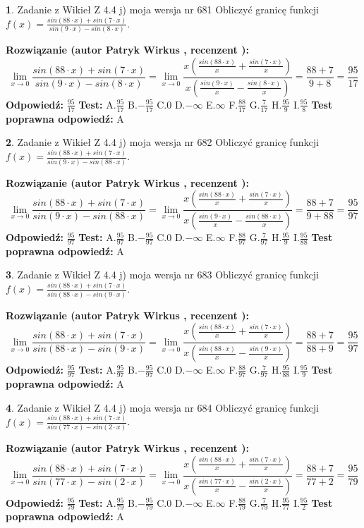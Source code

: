 \documentclass[12pt, a4paper]{article}
\theoremstyle{definition} %
\newtheorem{zad}{}
\newcommand{\zadStart}[1]{\begin{zad}#1\newline}
\newcommand{\zadStop}{\end{zad}}
\newcommand{\rozwStart}[2]{\noindent \textbf{Rozwiązanie (autor #1 , recenzent #2): }\newline}
\newcommand{\rozwStop}{\newline}
\newcommand{\odpStart}{\noindent \textbf{Odpowiedź:}\newline}
\newcommand{\odpStop}{\newline}
\newcommand{\testStart}{\noindent \textbf{Test:}\newline}
\newcommand{\testStop}{\newline}
\newcommand{\kluczStart}{\noindent \textbf{Test poprawna odpowiedź:}\newline}
\newcommand{\kluczStop}{\newline}
\begin{document}
\zadStart{Zadanie z Wikieł Z 4.4 j) moja wersja nr 681}
Obliczyć granicę funkcji $f(x)=\frac{sin(88\cdot x) +sin(7\cdot x)}{sin(9\cdot x) -sin(8\cdot x)}$.
\zadStop
\rozwStart{Patryk Wirkus}{}
$$\lim\limits_{x\to 0}\frac{sin(88\cdot x) +sin(7\cdot x)}{sin(9\cdot x) -sin(8\cdot x)}=\lim\limits_{x\to 0}\frac{x(\frac{sin(88\cdot x)}{x}+\frac{sin(7\cdot x)}{x})}{x(\frac{sin(9\cdot x)}{x}-\frac{sin(8\cdot x)}{x})}=\frac{88+7}{9+8} = \frac{95}{17}$$
\rozwStop
\odpStart
$\frac{95}{17}$
\odpStop
\testStart
A.$\frac{95}{17}$
B.$-\frac{95}{17}$
C.$0$
D.$-\infty$
E.$\infty$
F.$\frac{88}{17}$
G.$\frac{7}{17}$
H.$\frac{95}{9}$
I.$\frac{95}{8}$
\testStop
\kluczStart
A
\kluczStop



\zadStart{Zadanie z Wikieł Z 4.4 j) moja wersja nr 682}
Obliczyć granicę funkcji $f(x)=\frac{sin(88\cdot x) +sin(7\cdot x)}{sin(9\cdot x) -sin(88\cdot x)}$.
\zadStop
\rozwStart{Patryk Wirkus}{}
$$\lim\limits_{x\to 0}\frac{sin(88\cdot x) +sin(7\cdot x)}{sin(9\cdot x) -sin(88\cdot x)}=\lim\limits_{x\to 0}\frac{x(\frac{sin(88\cdot x)}{x}+\frac{sin(7\cdot x)}{x})}{x(\frac{sin(9\cdot x)}{x}-\frac{sin(88\cdot x)}{x})}=\frac{88+7}{9+88} = \frac{95}{97}$$
\rozwStop
\odpStart
$\frac{95}{97}$
\odpStop
\testStart
A.$\frac{95}{97}$
B.$-\frac{95}{97}$
C.$0$
D.$-\infty$
E.$\infty$
F.$\frac{88}{97}$
G.$\frac{7}{97}$
H.$\frac{95}{9}$
I.$\frac{95}{88}$
\testStop
\kluczStart
A
\kluczStop



\zadStart{Zadanie z Wikieł Z 4.4 j) moja wersja nr 683}
Obliczyć granicę funkcji $f(x)=\frac{sin(88\cdot x) +sin(7\cdot x)}{sin(88\cdot x) -sin(9\cdot x)}$.
\zadStop
\rozwStart{Patryk Wirkus}{}
$$\lim\limits_{x\to 0}\frac{sin(88\cdot x) +sin(7\cdot x)}{sin(88\cdot x) -sin(9\cdot x)}=\lim\limits_{x\to 0}\frac{x(\frac{sin(88\cdot x)}{x}+\frac{sin(7\cdot x)}{x})}{x(\frac{sin(88\cdot x)}{x}-\frac{sin(9\cdot x)}{x})}=\frac{88+7}{88+9} = \frac{95}{97}$$
\rozwStop
\odpStart
$\frac{95}{97}$
\odpStop
\testStart
A.$\frac{95}{97}$
B.$-\frac{95}{97}$
C.$0$
D.$-\infty$
E.$\infty$
F.$\frac{88}{97}$
G.$\frac{7}{97}$
H.$\frac{95}{88}$
I.$\frac{95}{9}$
\testStop
\kluczStart
A
\kluczStop



\zadStart{Zadanie z Wikieł Z 4.4 j) moja wersja nr 684}
Obliczyć granicę funkcji $f(x)=\frac{sin(88\cdot x) +sin(7\cdot x)}{sin(77\cdot x) -sin(2\cdot x)}$.
\zadStop
\rozwStart{Patryk Wirkus}{}
$$\lim\limits_{x\to 0}\frac{sin(88\cdot x) +sin(7\cdot x)}{sin(77\cdot x) -sin(2\cdot x)}=\lim\limits_{x\to 0}\frac{x(\frac{sin(88\cdot x)}{x}+\frac{sin(7\cdot x)}{x})}{x(\frac{sin(77\cdot x)}{x}-\frac{sin(2\cdot x)}{x})}=\frac{88+7}{77+2} = \frac{95}{79}$$
\rozwStop
\odpStart
$\frac{95}{79}$
\odpStop
\testStart
A.$\frac{95}{79}$
B.$-\frac{95}{79}$
C.$0$
D.$-\infty$
E.$\infty$
F.$\frac{88}{79}$
G.$\frac{7}{79}$
H.$\frac{95}{77}$
I.$\frac{95}{2}$
\testStop
\kluczStart
A
\kluczStop
\end{document}
